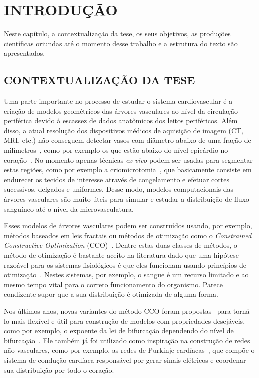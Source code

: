 \chapter{INTRODUÇÃO}

Neste capítulo, a contextualização da tese, os seus objetivos, as produções 
científicas oriundas até o momento desse trabalho e a estrutura do texto são 
apresentados.

\section{CONTEXTUALIZAÇÃO DA TESE}\label{sec:contextualizacao}

Uma parte importante no processo de estudar o sistema cardiovascular é a criação 
de modelos geométricos das árvores vasculares ao nível da circulação periférica 
devido à escassez de dados anatômicos dos leitos periféricos. Além disso, a 
atual resolução dos dispositivos médicos de aquisição de imagem (CT, MRI, etc.) 
não conseguem detectar vasos com diâmetro abaixo de uma fração de milímetros~\cite{Muller2008},
como por exemplo os que estão abaixo do nível epicárdio no coração~\cite{Jaquet2019}.
No momento apenas técnicas \textit{ex-vivo} podem ser usadas para 
segmentar estas regiões, como por exemplo a criomicrotomia~\cite{Goyal2013},
que basicamente consiste em endurecer os tecidos de interesse através de congelamento
e efetuar cortes sucessivos, delgados e uniformes. Desse modo, modelos computacionais
das árvores vasculares são muito úteis para simular e estudar a distribuição de fluxo 
sanguíneo até o nível da microvasculatura.

Esses modelos de árvores vasculares podem 
ser construídos usando, por exemplo, métodos baseados em leis fractais 
\cite{Van1989,Pelosi1987,Yang2013} 
ou métodos de otimização como o \textit{Constrained Constructive Optimization} 
(CCO)~\cite{Karch1999,Schreiner1993a,Schreiner1993b,Schreiner2006}. Dentre estas duas classes de métodos, 
o método de otimização é bastante aceito na literatura dado que uma hipótese razoável para os sistemas 
fisiológicos é que eles funcionam usando princípios de otimização~\cite{Kamiya1972,Murray1926,Thompson1992,Zamir1976}. 
Nestes sistemas, por exemplo, o sangue é um recurso limitado e ao mesmo tempo vital para o correto funcionamento 
do organismo. Parece condizente supor que a sua distribuição é otimizada de alguma forma.
 
Nos últimos anos, novas variantes do método CCO
foram propostas~\cite{Brito2017a,Brito2016,Brito2021,Georg2010,Jaquet2019,Meneses2017,Queiroz2013,Queiroz2018}
para torná-lo mais flexível e útil para construção de modelos com propriedades desejáveis, como por exemplo, 
o expoente da lei de bifurcação dependendo do 
nível de bifurcação~\cite{Meneses2016}. Ele também já foi 
utilizado como inspiração na construção de redes não vasculares, 
como por exemplo, as redes de Purkinje cardíacas~\cite{Ulysses2018}, que 
compõe o sistema de condução cardíaca responsável por gerar sinais elétricos e 
coordenar sua distribuição por todo o coração.

